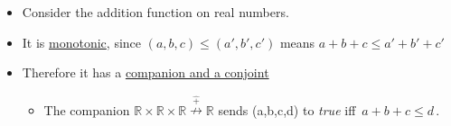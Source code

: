 \begin{itemize}
    \item Consider the addition function on real numbers.
    \item It is \href{doc/1 math/Seven Sketches in Compositionality/Chapter 1: Generative Effects/4 Monotone maps/1 Monotone map}{monotonic}, since $(a,b,c)\leq(a',b',c')$ means $a+b+c\leq a'+b'+c'$
    \item Therefore it has a \href{doc/1 math/Seven Sketches in Compositionality/Chapter 4: Co-design/3 Categories of profunctors/3 Fun profunctor facts - companions, conjoints, collages/1 Companion and conjoint}{companion and a conjoint}
          \begin{itemize}
            \item The companion $\mathbb{R}\times\mathbb{R}\times\mathbb{R}\overset{\hat +}\nrightarrow \mathbb{R}$ sends (a,b,c,d) to \emph{true} iff \,$a+b+c\leq d$\,.

          \end{itemize}
  \end{itemize}
